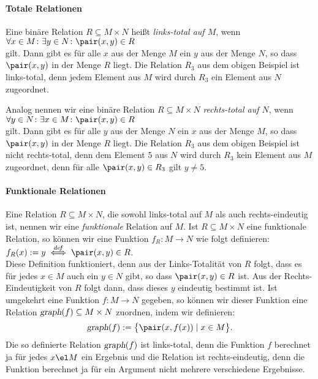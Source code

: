 \paragraph{Totale Relationen}
Eine binäre Relation $R \subseteq M \times N$ heißt \emph{links-total auf $M$}, wenn \\[0.2cm]
\hspace*{1.3cm} $\forall x \in M \colon \exists y \in N \colon \pair(x,y) \in R$ \\[0.2cm]
gilt. Dann gibt es für alle $x$ aus der Menge $M$ ein $y$ aus der Menge $N$, so dass
$\pair(x,y)$ in der Menge  $R$ liegt.  Die Relation $R_3$ aus dem obigen Beispiel ist
links-total, denn jedem Element aus $M$ wird durch $R_3$ ein Element aus $N$ zugeordnet.

Analog nennen wir eine binäre Relation $R \subseteq M \times N$  \emph{rechts-total auf $N$}, wenn \\[0.2cm]
\hspace*{1.3cm} $\forall y \in N \colon \exists x \in M \colon \pair(x,y) \in R$ \\[0.2cm]
gilt. Dann gibt es für alle $y$ aus der Menge $N$ ein $x$ aus der Menge $M$, so dass
$\pair(x,y)$ in der Menge  $R$ liegt.  Die Relation $R_3$ aus dem obigen Beispiel ist
nicht rechts-total, denn dem Element $5$ aus $N$ wird durch $R_3$ kein Element aus $M$
zugeordnet, denn für alle $\pair(x,y) \in R_3$ gilt $y \not= 5$.

\paragraph{Funktionale Relationen}
Eine Relation $R \subseteq M \times N$, die sowohl links-total auf $M$ als auch rechts-eindeutig
ist, nennen wir eine \emph{funktionale} Relation auf $M$.  Ist $R \subseteq M \times N$ eine
funktionale Relation, so können wir eine Funktion $f_R\colon M \rightarrow N$ wie folgt
definieren: \\[0.2cm]
\hspace*{1.3cm} $f_R(x) := y \;\stackrel{de\!f}{\Longleftrightarrow}\; \pair(x,y) \in R$. \\[0.2cm]
Diese Definition funktioniert, denn aus der Links-Totalität von $R$ folgt, dass es für
jedes $x\in M$ auch ein $y \in N$ gibt, so dass $\pair(x,y) \in R$ ist.  Aus der
Rechts-Eindeutigkeit von $R$ folgt dann, dass dieses $y$ eindeutig bestimmt ist.
Ist umgekehrt eine Funktion \mbox{$f:M \rightarrow N$} gegeben, so können wir dieser Funktion
eine Relation $\textsl{graph}(f) \subseteq M \times N$ zuordnen, indem wir definieren: 
\[ \textsl{graph}(f) := \bigl\{ \pair(x,f(x)) \mid  x\in M \bigr\}. \]
Die so definierte Relation $\textsl{graph}(f)$ ist links-total, denn die Funktion $f$
berechnet ja für jedes $x \el M$ ein Ergebnis und die Relation ist rechts-eindeutig,
denn die Funktion berechnet ja für ein Argument nicht mehrere verschiedene Ergebnisse.

